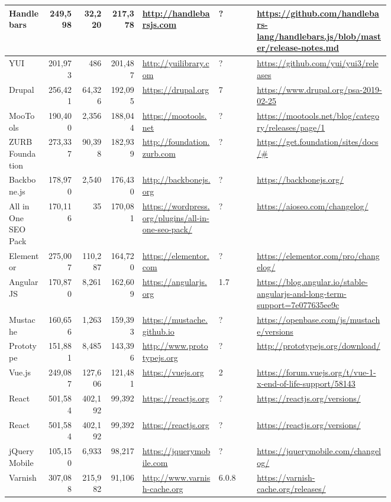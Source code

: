\begin{landscape}
\begin{longtable}{|p{0.1\linewidth}|r|r|r|p{0.2\linewidth}|p{0.1\linewidth}|p{0.35\linewidth}|}
		Handlebars &249,598 &32,220 &217,378 &\url{http://handlebarsjs.com} &? &\url{https://github.com/handlebars-lang/handlebars.js/blob/master/release-notes.md} \\\hline
		YUI &201,973 &486 &201,487 &\url{http://yuilibrary.com} &? &\url{https://github.com/yui/yui3/releases} \\\hline
		Drupal &256,421 &64,326 &192,095 &\url{https://drupal.org} &7 &\url{https://www.drupal.org/psa-2019-02-25} \\\hline
		MooTools &190,400 &2,356 &188,044 &\url{https://mootools.net} &? &\url{https://mootools.net/blog/category/releases/page/1} \\\hline
		ZURB Foundation &273,337 &90,398 &182,939 &\url{http://foundation.zurb.com} &? &\url{https://get.foundation/sites/docs/\#} \\\hline
		Backbone.js &178,970 &2,540 &176,430 &\url{http://backbonejs.org} &? &\url{https://backbonejs.org/} \\\hline
		All in One SEO Pack &170,116 &35 &170,081 &\url{https://wordpress.org/plugins/all-in-one-seo-pack/} &? &\url{https://aioseo.com/changelog/} \\\hline
		Elementor &275,007 &110,287 &164,720 &\url{https://elementor.com} &? &\url{https://elementor.com/pro/changelog/} \\\hline
		AngularJS &170,870 &8,261 &162,609 &\url{https://angularjs.org} &1.7 &\url{https://blog.angular.io/stable-angularjs-and-long-term-support=7e077635ee9c} \\\hline
		Mustache &160,656 &1,263 &159,393 &\url{https://mustache.github.io} &? &\url{https://openbase.com/js/mustache/versions} \\\hline
		Prototype &151,881 &8,485 &143,396 &\url{http://www.prototypejs.org} &? &\url{http://prototypejs.org/download/} \\\hline
		Vue.js &249,087 &127,606 &121,481 &\url{https://vuejs.org} &2 &\url{https://forum.vuejs.org/t/vue-1-x-end-of-life-support/58143} \\\hline
		React &501,584 &402,192 &99,392 &\url{https://reactjs.org} &? &\url{https://reactjs.org/versions/} \\\hline
		React &501,584 &402,192 &99,392 &\url{https://reactjs.org} &? &\url{https://reactjs.org/versions/} \\\hline
		jQuery Mobile &105,150 &6,933 &98,217 &\url{https://jquerymobile.com} &? &\url{https://jquerymobile.com/changelog/} \\\hline
		Varnish &307,088 &215,982 &91,106 &\url{http://www.varnish-cache.org} &6.0.8 &\url{https://varnish-cache.org/releases/} \\\hline

\end{longtable}
\end{landscape}
